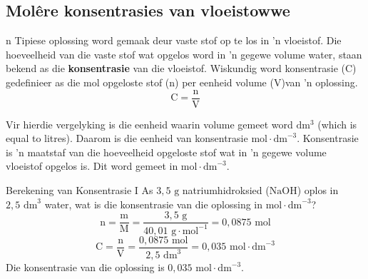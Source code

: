             \subsection*{Mol\^{e}re konsentrasies van vloeistowwe}
            \nopagebreak
n Tipiese oplossing word gemaak deur vaste stof op te los in 'n vloeistof. Die hoeveelheid van die vaste stof wat opgelos word in   'n gegewe volume water, staan bekend as die \textbf{konsentrasie} van die vloeistof. Wiskundig word konsentrasie (C) gedefinieer as die mol opgeloste stof (n) per eenheid volume (V)van   'n oplossing.\\
      \label{m38712*id282860}\nopagebreak\noindent{}      
    \begin{equation*}
    \text{C}=\frac{\text{n}}{\text{V}}
      \end{equation*}
	\begin{figure}[H] %
\begin{center}
\end{center}
 \end{figure}
Vir hierdie vergelyking is die eenheid waarin volume gemeet word $\text{dm}{}^{3}$ (which is equal to litres). Daarom is die eenheid van  konsentrasie  $\text{mol} \cdot {\text{dm}}^{-3}$. 
\label{m38712*fhsst!!!underscore!!!id1650}
 {Konsentrasie is  'n maatstaf van die hoeveelheid opgeloste stof wat in 'n gegewe volume vloeistof opgelos is. Dit word gemeet in $\text{mol} \cdot {\text{dm}}^{-3}$.} 
 
      \noindent
      \begin{wex}{Berekening van Konsentrasie I}
{
      \label{m38712*probfhsst!!!underscore!!!id1654}
      \label{m38712*id283003}As $3,5\text{ g}$ natriumhidroksied ($\text{NaOH}$) oplos in $2,5 {\text{ dm}}^{3}$ water, wat is die konsentrasie van die oplossing in $\text{mol}\ensuremath{\cdot}{\text{dm}}^{-3}$? }
{
      \label{m38712*id283067}\nopagebreak\noindent{}
    \begin{equation*}
    \text{n}=\frac{\text{m}}{\text{M}}=\frac{3,5 \text{ g}}{40,01 \text{ g} \cdot \text{mol}^{-1}} = 0,0875 \text{ mol}
      \end{equation*}
\begin{equation*}
\text{C}=\frac{\text{n}}{\text{V}}=\frac{0,0875 \text{ mol}}{2,5 \text{ dm}^{3} }=0,035 \text{ mol} \cdot \text{dm}^{-3}
\end{equation*}
Die konsentrasie van die oplossing is $0,035 \text{ mol} \cdot {\text{dm}}^{-3}$.
}
    \end{wex}

